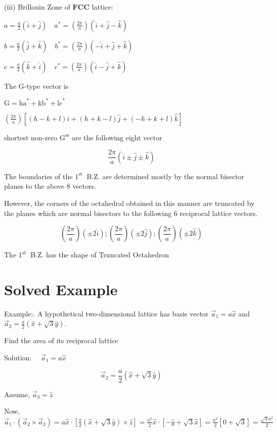 (iii) Brillouin Zone of $\mathbf{F C C}$ lattice:

$a=\frac{a}{2}(\hat{i}+\hat{j}) \quad a^{*}=\left(\frac{2 \pi}{a}\right)(\hat{i}+\hat{j}-\hat{k})$



$b=\frac{a}{2}(\hat{j}+\hat{k}) \quad b^{*}=\left(\frac{2 \pi}{a}\right)(-\hat{i}+\hat{j}+\hat{k})$

$c=\frac{a}{2}(\hat{k}+\hat{i}) \quad c^{*}=\left(\frac{2 \pi}{a}\right)(\hat{i}-\hat{j}+\hat{k})$

The G-type vector is

$\mathrm{G}=\mathrm{ha}^{*}+\mathrm{kb}^{*}+\mathrm{lc}^{*}$

$\left(\frac{2 \pi}{a}\right)[(h-k+l) \hat{i}+(h+k-l) \hat{j}+(-h+k+l) \hat{k}]$

shortest non-zero $\mathrm{G}^{\mathrm{ss}}$ are the following eight vector

$$
\frac{2 \pi}{a}(\hat{i} \pm \hat{j} \pm \hat{k})
$$



The boundaries of the $1^{\text {st }}$ B.Z. are determined mostly by the normal bisector planes to the above 8 vectors.

However, the corners of the octahedral obtained in this manner are truncated by the planes which are normal bisectors to the following 6 reciprocal lattice vectors.

$$
\left(\frac{2 \pi}{a}\right)(\pm 2 \hat{i}) ;\left(\frac{2 \pi}{a}\right)(\pm 2 \hat{j}) ;\left(\frac{2 \pi}{a}\right)(\pm 2 \hat{k})
$$

The $1^{\text {st }}$ B.Z. has the shape of Truncated Octahedron 



\section{Solved Example}

Example:. A hypothetical two-dimensional lattice has basis vector $\vec{a}_{1}=a \hat{x}$ and $\vec{a}_{2}=\frac{a}{2}(\hat{x}+\sqrt{3} \hat{y})$.

Find the area of its reciprocal lattice

Solution: $\quad \vec{a}_{1}=a \hat{x}$

$$
\vec{a}_{2}=\frac{a}{2}(\hat{x}+\sqrt{3} \hat{y})
$$

Assume, $\vec{a}_{3}=\hat{z}$

Now, $\vec{a}_{1} \cdot\left(\vec{a}_{2} \times \vec{a}_{3}\right)=a \hat{x} \cdot\left[\frac{a}{2}(\hat{x}+\sqrt{3} \hat{y}) \times \hat{z}\right]=\frac{a^{2}}{2} \hat{x} \cdot[-\hat{y}+\sqrt{3} \hat{x}]=\frac{a^{2}}{2}[0+\sqrt{3}]=\frac{\sqrt{3} a^{2}}{2}$

